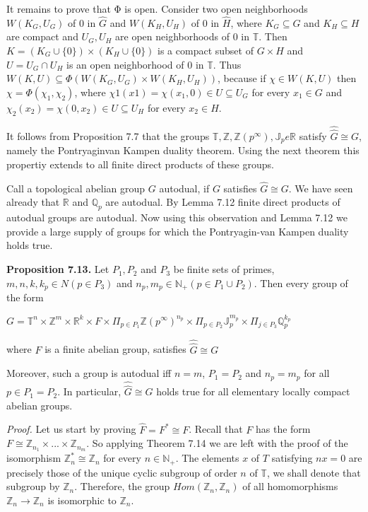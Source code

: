\documentclass[12pt]{article}
\begin{document}
\begin{itemize}
\begin{itemize}
    It remains to prove that Φ is open. Consider two open neighborhoods $W(K_G, U_G)$ of 0 in $\hat{G}$ and $W(K_H, U_H)$
of 0 in $\hat{H}$, where $K_G \subseteq G$ and $K_H \subseteq H$ are compact and $U_G, U_H$ are open neighborhoods of 0 in $\mathbb{T}$. Then
$K = (K_G \cup \{0\}) \times (K_H \cup \{0\})$ is a compact subset of $G \times H$ and $U = U_G \cap U_H$ is an open neighborhood of
0 in $\mathbb{T}$. Thus $W(K, U) \subseteq \Phi(W(K_G, U_G) \times W(K_H, U_H))$, because if $\chi \in W(K, U)$ then $\chi = \Phi(\chi_1, \chi_2)$, where
$χ1(x1) = \chi(x_1, 0) \in U \subseteq U_G$ for every $x_1 \in G$ and $\chi_2(x_2) = \chi(0, x_2) \in U \subseteq U_H$ for every $x_2 \in H$.


    It follows from Proposition 7.7 that the groups $\mathbb{T}, \mathbb{Z}, \mathbb{Z}(p^{\infty}), \mathbb{J}_p e \mathbb{R}$ satisfy $\hat{\hat{G}} \cong G$, namely the 
Pontryaginvan Kampen duality theorem. Using the next theorem this propertiy extends to all finite direct products of
these groups.


    Call a topological abelian group $G$ autodual, if $G$ satisfies $\hat{G} \cong G$. We have seen already that $\mathbb{R}$ and $\mathbb{Q}_p$ are
autodual. By Lemma 7.12 finite direct products of autodual groups are autodual. Now using this observation
and Lemma 7.12 we provide a large supply of groups for which the Pontryagin-van Kampen duality holds true.


\textbf{Proposition 7.13.} Let $P_1, P_2$ and $P_3$ be finite sets of primes, $m, n, k, k_p \in N (p \in P_3)$ and
$n_p, m_p \in \mathbb{N}_+ (p \in P_1 \cup P_2)$. Then every group of the form


    $G = \mathbb{T}^n \times \mathbb{Z}^m \times \mathbb{R}^k \times F \times \Pi_{p \in P_1} \mathbb{Z} (p^{\infty})^{n_p} \times \Pi_{p \in P_2} \mathbb{J}_{p}^{m_p} \times \Pi_{j \in P_3} \mathbb{Q}_{p}^{k_p}$


where $F$ is a finite abelian group, satisfies $\hat{\hat{G}} \cong G$


Moreover, such a group is autodual iff $n = m$, $P_1 = P_2$ and $n_p = m_p$ for all $p \in P_1 = P_2$. In particular,
$\hat{\hat{G}} \cong G$ holds true for all elementary locally compact abelian groups.


\emph{Proof.} Let us start by proving $\hat{F} = F^* \cong F$. Recall that $F$ has the form $F \cong \mathbb{Z}_{n_1} \times . . . \times \mathbb{Z}_{n_m}$. So applying
Theorem 7.14 we are left with the proof of the isomorphism $\mathbb{Z}^*_n \cong \mathbb{Z}_n$ for every $n \in \mathbb{N}_+$. The elements $x$ of
$T$ satisfying $nx = 0$ are precisely those of the unique cyclic subgroup of order $n$ of $\mathbb{T}$, we shall denote that
subgroup by $\mathbb{Z}_n$. Therefore, the group $Hom(\mathbb{Z}_n,\mathbb{Z}_n)$ of all homomorphisms $\mathbb{Z}_n \to \mathbb{Z}_n$ is isomorphic to $\mathbb{Z}_n$.



\end{itemize}
\end{itemize}
\end{document}
